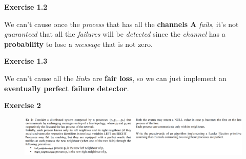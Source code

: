 \documentclass{article}
\begin{document}
\begin{algorithm}[H]
\renewcommand{\thealgorithm}{}
\caption{\textbf{Exercise 1.2}}
We can't cause once the \emph{process} that has all the \textbf{channels A }\emph{fails}, it's not \emph{guaranteed} that all the \emph{failures} will be \emph{detected} since the \emph{channel} has a \textbf{probability} to lose a \emph{message} that is not zero.  
\end{algorithm}
\begin{algorithm}[H]
\renewcommand{\thealgorithm}{}
\caption{\textbf{Exercise 1.3}}
We can't cause all the \emph{links} are \textbf{fair loss}, so we can just implement an \textbf{eventually perfect failure detector}.
\end{algorithm}
\clearpage
\textbf{Exercise 2}
\begin{figure}[H]
  \centering
  \includegraphics[scale=0.6,left]{cattura29.png}
\end{figure}
\end{document}
